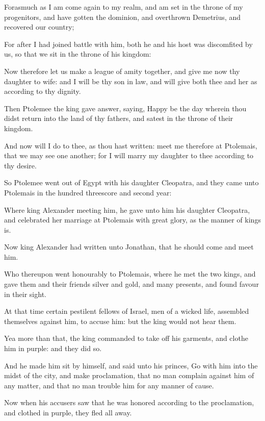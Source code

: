 {\par }{\PP {}Forasmuch as I am come again to my realm, and am set in the throne of my progenitors, and have gotten the dominion, and overthrown Demetrius, and recovered our country;
\par }{\PP {}For after I had joined battle with him, both he and his host was discomfited by us, so that we sit in the throne of his kingdom:
\par }{\PP {}Now therefore let us make a league of amity together, and give me now thy daughter to wife: and I will be thy son in law, and will give both thee and her as according to thy dignity.
\par }{\PP {}Then Ptolemee the king gave answer, saying, Happy be the day wherein thou didst return into the land of thy fathers, and satest in the throne of their kingdom.
\par }{\PP {}And now will I do to thee, as thou hast written: meet me therefore at Ptolemais, that we may see one another; for I will marry my daughter to thee according to thy desire.
\par }{\PP {}So Ptolemee went out of Egypt with his daughter Cleopatra, and they came unto Ptolemais in the hundred threescore and second year:
\par }{\PP {}Where king Alexander meeting him, he gave unto him his daughter Cleopatra, and celebrated her marriage at Ptolemais with great glory, as the manner of kings is.
\par }{\PP {}Now king Alexander had written unto Jonathan, that he should come and meet him.
\par }{\PP {}Who thereupon went honourably to Ptolemais, where he met the two kings, and gave them and their friends silver and gold, and many presents, and found favour in their sight.
\par }{\PP {}At that time certain pestilent fellows of Israel, men of a wicked life, assembled themselves against him, to accuse him: but the king would not hear them.
\par }{\PP {}Yea more than that, the king commanded to take off his garments, and clothe him in purple: and they did so.
\par }{\PP {}And he made him sit by himself, and said unto his princes, Go with him into the midst of the city, and make proclamation, that no man complain against him of any matter, and that no man trouble him for any manner of cause.
\par }{\PP {}Now when his accusers saw that he was honored according to the proclamation, and clothed in purple, they fled all away.
}
